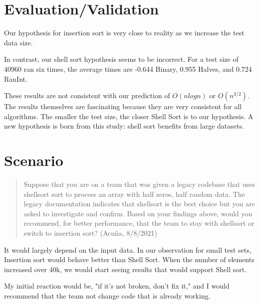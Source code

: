 \documentclass{article}
\begin{document}
\section{Evaluation/Validation}

Our hypothesis for insertion sort is very close to reality as we increase the test data size. 

In contrast, our shell sort hypothesis seems to be incorrect. For a test size of 40960 ran six times, the average times are -0.644 Binary, 0.955 Halves, and 0.724 RanInt.  

These results are not consistent with our prediction of $O(nlogn)$ or $O(n^{3/2})$. The results themselves are fascinating because they are very consistent for all algorithms. The smaller the test size, the closer Shell Sort is to our hypothesis.  A new hypothesis is born from this study: shell sort benefits from large datasets.

\section{Scenario}

\begin{quote}
  Suppose that you are on a team that was given a legacy codebase that uses shellsort sort to
  process an array with half zeros, half random data. The legacy documentation indicates that shellsort
  is the best choice but you are asked to investigate and confirm. Based on your findings above, would
  you recommend, for better performance, that the team to stay with shellsort or switch to insertion sort?  (Acu\~{n}a, 8/8/2021)
\end{quote}

It would largely depend on the input data. In our observation for small test sets, Insertion sort would behave better than Shell Sort. When the number of elements increased over 40k, we would start seeing results that would support Shell sort. 

My initial reaction would be, "if it's not broken, don't fix it," and I would recommend that the team not change code that is already working.
\end{document}

